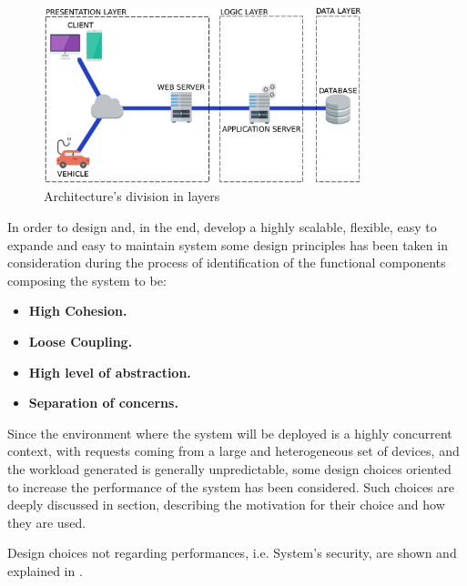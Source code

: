 \begin{figure}[H]
	\centerline{
		\includegraphics[width=350px]{../Datas/images/PEhla.pdf}
	}	
	\caption{Architecture's division in layers}
		\label{fig:PEhla}
\end{figure}

In order to design and, in the end, develop a highly scalable, flexible, easy to expande and easy to maintain system some design principles has been taken in consideration during the process of identification of the functional components composing the system to be:

\begin{itemize}
	\item \textbf{High Cohesion.}
	\item \textbf{Loose Coupling.}
	\item \textbf{High level of abstraction.}
	\item \textbf{Separation of concerns.}
\end{itemize}

Since the environment where the system will be deployed is a highly concurrent context, with requests coming from a large and heterogeneous set of devices, and the workload generated is generally unpredictable, some design choices oriented to increase the performance of the system has been considered.
Such choices are deeply discussed in \textit{} section, describing the motivation for their choice and how they are used.

Design choices not regarding performances, i.e. System's security, are shown and explained in \textit{}.
